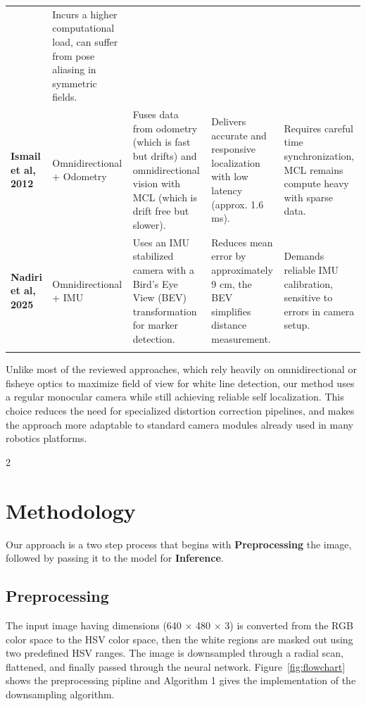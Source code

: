 \documentclass[a4paper]{article}
\begin{document}
\begin{center}
{\begin{tabular}{@{}llp{4.5cm}p{4cm}p{4cm}@{}}
& Incurs a higher computational load, can suffer from pose aliasing in symmetric fields.
\\ 
\addlinespace
\textbf{Ismail et al, 2012} & Omnidirectional + Odometry & Fuses data from odometry (which is fast but drifts) and omnidirectional vision with MCL (which is drift free but slower).
& Delivers accurate and responsive localization with low latency (approx. 1.6 ms).
& Requires careful time synchronization, MCL remains compute heavy with sparse data.
\\ 
\addlinespace
\textbf{Nadiri et al, 2025} & Omnidirectional + IMU & Uses an IMU stabilized camera with a Bird’s Eye View (BEV) transformation for marker detection.
& Reduces mean error by approximately 9 cm, the BEV simplifies distance measurement.
& Demands reliable IMU calibration, sensitive to errors in camera setup.
\\ 
\addlinespace
\bottomrule
\end{tabular}%
}
\end{center}

\vspace{0.5cm}
\par \noindent
Unlike most of the reviewed approaches, which rely heavily on omnidirectional or fisheye optics to maximize field of view for white line detection, 
our method uses a regular monocular camera while still achieving reliable self localization.
This choice reduces the need for specialized distortion 
correction pipelines, and makes the approach more adaptable to standard camera modules already used in many robotics platforms.
\begin{multicols}{2} %

\section{Methodology}
\par \noindent Our approach is a two step process that begins with \textbf{Preprocessing} the image,
followed by passing it to the model for \textbf{Inference}.
\subsection{Preprocessing}
\par \noindent The input image having dimensions (640 $\times$ 480 $\times$ 3) is converted from the RGB color space to the HSV color space, then the white regions are masked out using two predefined HSV ranges.
The image is downsampled through a radial scan, flattened, and finally passed through the neural network.
Figure~\ref{fig:flowchart} shows the preprocessing pipline and Algorithm 1 gives the implementation of the downsampling algorithm.
\end{multicols}
\end{document}
